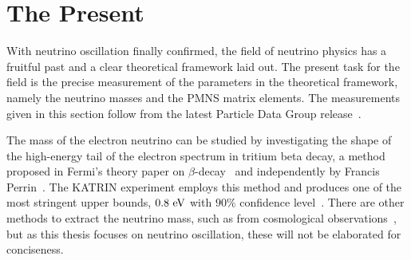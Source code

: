 





\section{The Present}
With neutrino oscillation finally confirmed, the field of neutrino physics has a fruitful past and a clear theoretical framework laid out.
The present task for the field is the precise measurement of the parameters in the theoretical framework, namely the neutrino masses and the PMNS matrix elements.
The measurements given in this section follow from the latest Particle Data Group release~\cite{ParticleDataGroup:2024cfk}.

The mass of the electron neutrino can be studied by investigating the shape of the high-energy tail of the electron spectrum in tritium beta decay, a method proposed in Fermi's theory paper on $\beta$-decay~\cite{Fermi:1934hr} and independently by Francis Perrin~\cite{Perrin1933}.
The KATRIN experiment employs this method and produces one of the most stringent upper bounds, $0.8~\textrm{eV}$ with $90\%$ confidence level~\cite{KATRIN:2021uub}.
There are other methods to extract the neutrino mass, such as from cosmological observations~\cite{Brieden:2022lsd}, but as this thesis focuses on neutrino oscillation, these will not be elaborated for conciseness.

